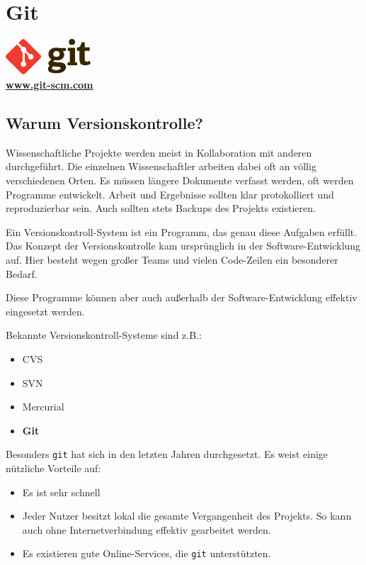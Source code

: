 \chapter{Git}
\begin{center}
    \includegraphics[width=120px]{img/git.pdf} \\
    \textbf{\href{http://git-scm.com}{www.git-scm.com}}
\end{center}

\section{Warum Versionskontrolle?}

Wissenschaftliche Projekte werden meist in Kollaboration mit anderen durchgeführt.
Die einzelnen Wissenschaftler arbeiten dabei oft an völlig verschiedenen Orten.
Es müssen längere Dokumente verfasst werden, oft werden Programme entwickelt.
Arbeit und Ergebnisse sollten klar protokolliert und reproduzierbar sein.
Auch sollten stets Backups des Projekts existieren.

Ein Versionskontroll-System ist ein Programm, das genau diese Aufgaben erfüllt.
Das Konzept der Versionskontrolle kam ursprünglich in der Software-Entwicklung auf.
Hier besteht wegen großer Teams und vielen Code-Zeilen ein besonderer Bedarf.

Diese Programme können aber auch außerhalb der Software-Entwicklung
effektiv eingesetzt werden.

Bekannte Versionskontroll-Systeme sind z.B.:
\begin{itemize}
  \item CVS
  \item SVN
  \item Mercurial
  \item \textbf{Git}
\end{itemize}

Besonders \texttt{git} hat sich in den letzten Jahren durchgesetzt.
Es weist einige nützliche Vorteile auf:
\begin{itemize}
  \item Es ist sehr schnell
  \item Jeder Nutzer besitzt lokal die gesamte Vergangenheit des Projekts.
    So kann auch ohne Internetverbindung effektiv gearbeitet werden.
  \item Es existieren gute Online-Services, die \texttt{git} unterstützten.
\end{itemize}

